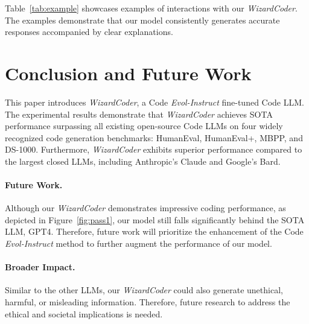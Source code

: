 \documentclass{article}
\newcommand{\name}{\emph{Evol-Instruct}}
\newcommand{\modelname}{\emph{WizardCoder}}
\begin{document}
Table~\ref{tab:example} showcases examples of interactions with our \modelname{}. The examples demonstrate that our model consistently generates accurate responses accompanied by clear explanations. \section{Conclusion and Future Work}

This paper introduces \modelname{}, a Code \name{} fine-tuned Code LLM. The experimental results demonstrate that \modelname{} achieves SOTA performance surpassing all existing open-source Code LLMs on four widely recognized code generation benchmarks: HumanEval, HumanEval+, MBPP, and DS-1000. Furthermore, \modelname{} exhibits superior performance compared to the largest closed LLMs, including Anthropic's Claude and Google's Bard.

\paragraph{Future Work.} Although our \modelname{} demonstrates impressive coding performance, as depicted in Figure~\ref{fig:pass1}, our model still falls significantly behind the SOTA LLM, GPT4. Therefore, future work will prioritize the enhancement of the Code \name{} method to further augment the performance of our model.

\paragraph{Broader Impact.} Similar to the other LLMs, our \modelname{} could also generate unethical, harmful, or misleading information. Therefore, future research to address the ethical and societal implications is needed. 
\clearpage

{\small

}
\end{document}
